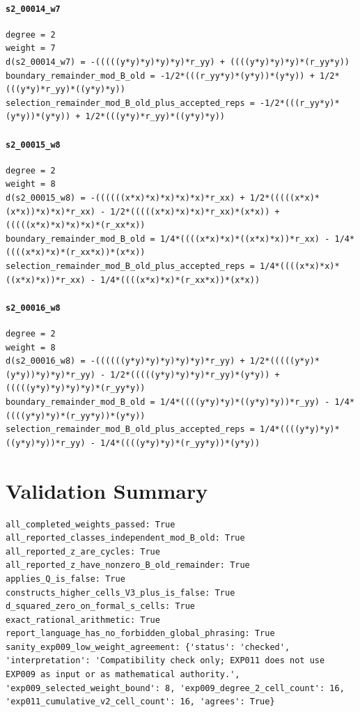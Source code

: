 \documentclass[11pt]{article}
\begin{document}
\paragraph{\texttt{s2\_00014\_w7}}
\begin{verbatim}
degree = 2
weight = 7
d(s2_00014_w7) = -(((((y*y)*y)*y)*y)*r_yy) + ((((y*y)*y)*y)*(r_yy*y))
boundary_remainder_mod_B_old = -1/2*(((r_yy*y)*(y*y))*(y*y)) + 1/2*(((y*y)*r_yy)*((y*y)*y))
selection_remainder_mod_B_old_plus_accepted_reps = -1/2*(((r_yy*y)*(y*y))*(y*y)) + 1/2*(((y*y)*r_yy)*((y*y)*y))
\end{verbatim}
\paragraph{\texttt{s2\_00015\_w8}}
\begin{verbatim}
degree = 2
weight = 8
d(s2_00015_w8) = -((((((x*x)*x)*x)*x)*x)*r_xx) + 1/2*(((((x*x)*(x*x))*x)*x)*r_xx) - 1/2*(((((x*x)*x)*x)*r_xx)*(x*x)) + (((((x*x)*x)*x)*x)*(r_xx*x))
boundary_remainder_mod_B_old = 1/4*((((x*x)*x)*((x*x)*x))*r_xx) - 1/4*((((x*x)*x)*(r_xx*x))*(x*x))
selection_remainder_mod_B_old_plus_accepted_reps = 1/4*((((x*x)*x)*((x*x)*x))*r_xx) - 1/4*((((x*x)*x)*(r_xx*x))*(x*x))
\end{verbatim}
\paragraph{\texttt{s2\_00016\_w8}}
\begin{verbatim}
degree = 2
weight = 8
d(s2_00016_w8) = -((((((y*y)*y)*y)*y)*y)*r_yy) + 1/2*(((((y*y)*(y*y))*y)*y)*r_yy) - 1/2*(((((y*y)*y)*y)*r_yy)*(y*y)) + (((((y*y)*y)*y)*y)*(r_yy*y))
boundary_remainder_mod_B_old = 1/4*((((y*y)*y)*((y*y)*y))*r_yy) - 1/4*((((y*y)*y)*(r_yy*y))*(y*y))
selection_remainder_mod_B_old_plus_accepted_reps = 1/4*((((y*y)*y)*((y*y)*y))*r_yy) - 1/4*((((y*y)*y)*(r_yy*y))*(y*y))
\end{verbatim}
\section*{Validation Summary}
\begin{verbatim}
all_completed_weights_passed: True
all_reported_classes_independent_mod_B_old: True
all_reported_z_are_cycles: True
all_reported_z_have_nonzero_B_old_remainder: True
applies_Q_is_false: True
constructs_higher_cells_V3_plus_is_false: True
d_squared_zero_on_formal_s_cells: True
exact_rational_arithmetic: True
report_language_has_no_forbidden_global_phrasing: True
sanity_exp009_low_weight_agreement: {'status': 'checked', 'interpretation': 'Compatibility check only; EXP011 does not use EXP009 as input or as mathematical authority.', 'exp009_selected_weight_bound': 8, 'exp009_degree_2_cell_count': 16, 'exp011_cumulative_v2_cell_count': 16, 'agrees': True}
\end{verbatim}
\end{document}
